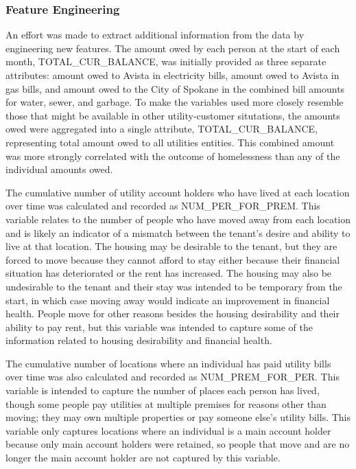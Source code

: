 \documentclass[10pt,letterpaper]{article}
\begin{document}
\subsubsection*{Feature Engineering}
An effort was made to extract additional information from the data by engineering new features. The amount owed by each person at the start of each month, TOTAL\_CUR\_BALANCE, was initially provided as three separate attributes: amount owed to Avista in electricity bills, amount owed to Avista in gas bills, and amount owed to the City of Spokane in the combined bill amounts for water, sewer, and garbage. To make the variables used more closely resemble those that might be available in other utility-customer situtations, the amounts owed were aggregated into a single attribute, TOTAL\_CUR\_BALANCE, representing total amount owed to all utilities entities. This combined amount was more strongly correlated with the outcome of homelessness than any of the individual amounts owed.

The cumulative number of utility account holders who have lived at each location over time was calculated and recorded as NUM\_PER\_FOR\_PREM. This variable relates to the number of people who have moved away from each location and is likely an indicator of a mismatch between the tenant's desire and ability to live at that location. The housing may be desirable to the tenant, but they are forced to move because they cannot afford to stay either because their financial situation has deteriorated or the rent has increased. The housing may also be undesirable to the tenant and their stay was intended to be temporary from the start, in which case moving away would indicate an improvement in financial health. People move for other reasons besides the housing desirability and their ability to pay rent, but this variable was intended to capture some of the information related to housing desirability and financial health.

The cumulative number of locations where an individual has paid utility bills over time was also calculated and recorded as NUM\_PREM\_FOR\_PER. This variable is intended to capture the number of places each person has lived, though some people pay utilities at multiple premises for reasons other than moving; they may own multiple properties or pay someone else's utility bills. This variable only captures locations where an individual is a main account holder because only main account holders were retained, so people that move and are no longer the main account holder are not captured by this variable.
\end{document}
